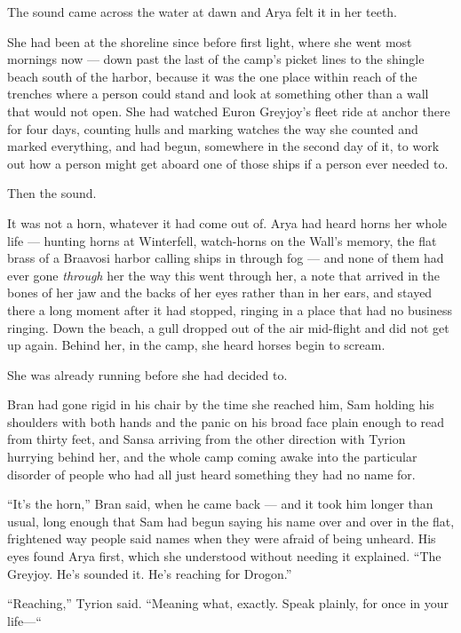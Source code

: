 The sound came across the water at dawn and Arya felt it in her teeth.

She had been at the shoreline since before first light, where she went most mornings now — down past the last of the camp’s picket lines to the shingle beach south of the harbor, because it was the one place within reach of the trenches where a person could stand and look at something other than a wall that would not open. She had watched Euron Greyjoy’s fleet ride at anchor there for four days, counting hulls and marking watches the way she counted and marked everything, and had begun, somewhere in the second day of it, to work out how a person might get aboard one of those ships if a person ever needed to.

Then the sound.

It was not a horn, whatever it had come out of. Arya had heard horns her whole life — hunting horns at Winterfell, watch-horns on the Wall’s memory, the flat brass of a Braavosi harbor calling ships in through fog — and none of them had ever gone \textit{through} her the way this went through her, a note that arrived in the bones of her jaw and the backs of her eyes rather than in her ears, and stayed there a long moment after it had stopped, ringing in a place that had no business ringing. Down the beach, a gull dropped out of the air mid-flight and did not get up again. Behind her, in the camp, she heard horses begin to scream.

She was already running before she had decided to.

\sceneBreak

Bran had gone rigid in his chair by the time she reached him, Sam holding his shoulders with both hands and the panic on his broad face plain enough to read from thirty feet, and Sansa arriving from the other direction with Tyrion hurrying behind her, and the whole camp coming awake into the particular disorder of people who had all just heard something they had no name for.

“It’s the horn,” Bran said, when he came back — and it took him longer than usual, long enough that Sam had begun saying his name over and over in the flat, frightened way people said names when they were afraid of being unheard. His eyes found Arya first, which she understood without needing it explained. “The Greyjoy. He’s sounded it. He’s reaching for Drogon.”

“Reaching,” Tyrion said. “Meaning what, exactly. Speak plainly, for once in your life—“

